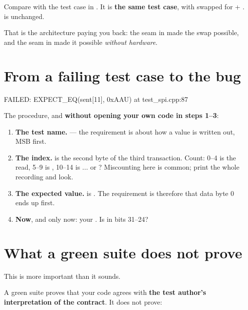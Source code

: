 Compare with the test case in . It is \textbf{the same test case}, with
 swapped for  + .  is unchanged.

That is the architecture paying you back: the seam in  made the swap possible, and
the seam in  made it possible \emph{without hardware}.

\section{From a failing test case to the bug}
\label{sec:debugging}

\begin{console}
FAILED: EXPECT_EQ(sent[11], 0xAAU) at test_spi.cpp:87
\end{console}

The procedure, and \textbf{without opening your own code in steps 1--3}:

\begin{enumerate}
  \item \textbf{The test name.}  --- the
    requirement is about how a value is written out, MSB first.
  \item \textbf{The index.}  is the second byte of the third transaction. Count:
    0--4 is the  read, 5--9 is , 10--14 is ... or
    ? Miscounting here is common; print the whole recording and look.
  \item \textbf{The expected value.}  is . The requirement is
    therefore that data byte 0 ends up first.
  \item \textbf{Now}, and only now: your . Is  in bits 31--24?
\end{enumerate}

\section{What a green suite does not prove}
\label{sec:notproven}

This is more important than it sounds.

A green suite proves that your code agrees with \textbf{the test author's interpretation of the
contract}. It does not prove:

